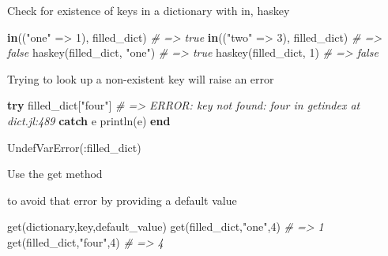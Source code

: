 \documentclass[ignorenonframetext,]{beamer}
\newenvironment{Shaded}{}{}
\newcommand{\KeywordTok}[1]{\textcolor[rgb]{0.00,0.44,0.13}{\textbf{{#1}}}}
\newcommand{\FloatTok}[1]{\textcolor[rgb]{0.25,0.63,0.44}{{#1}}}
\newcommand{\StringTok}[1]{\textcolor[rgb]{0.25,0.44,0.63}{{#1}}}
\newcommand{\CommentTok}[1]{\textcolor[rgb]{0.38,0.63,0.69}{\textit{{#1}}}}
\newcommand{\NormalTok}[1]{{#1}}
\begin{document}
\begin{frame}[fragile]{Check for existence of keys in a dictionary with
in, haskey}

\begin{Shaded}
\begin{Highlighting}[]
\KeywordTok{in}\NormalTok{((}\StringTok{"one"} \NormalTok{=> }\FloatTok{1}\NormalTok{), filled_dict) }\CommentTok{# => true}
\KeywordTok{in}\NormalTok{((}\StringTok{"two"} \NormalTok{=> }\FloatTok{3}\NormalTok{), filled_dict) }\CommentTok{# => false}
\NormalTok{haskey(filled_dict, }\StringTok{"one"}\NormalTok{) }\CommentTok{# => true}
\NormalTok{haskey(filled_dict, }\FloatTok{1}\NormalTok{) }\CommentTok{# => false}
\end{Highlighting}
\end{Shaded}

\end{frame}

\begin{frame}[fragile]{Trying to look up a non-existent key will raise
an error}

\begin{Shaded}
\begin{Highlighting}[]
\KeywordTok{try}
    \NormalTok{filled_dict[}\StringTok{"four"}\NormalTok{] }\CommentTok{# => ERROR: key not found: four in getindex at dict.jl:489}
\KeywordTok{catch} \NormalTok{e}
    \NormalTok{println(e)}
\KeywordTok{end}
\end{Highlighting}
\end{Shaded}

\begin{Shaded}
\begin{Highlighting}[]
\NormalTok{UndefVarError(:filled_dict)}
\end{Highlighting}
\end{Shaded}

\end{frame}

\begin{frame}[fragile]{Use the get method}

to avoid that error by providing a default value

\begin{Shaded}
\begin{Highlighting}[]
\NormalTok{get(dictionary,key,default_value)}
\NormalTok{get(filled_dict,}\StringTok{"one"}\NormalTok{,}\FloatTok{4}\NormalTok{) }\CommentTok{# => 1}
\NormalTok{get(filled_dict,}\StringTok{"four"}\NormalTok{,}\FloatTok{4}\NormalTok{) }\CommentTok{# => 4}
\end{Highlighting}
\end{Shaded}

\end{frame}
\end{document}
